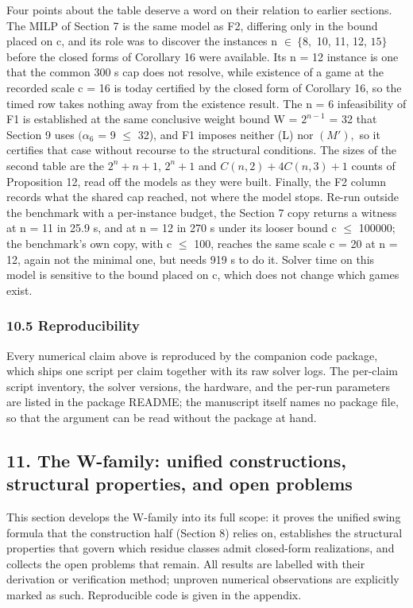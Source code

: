 \documentclass[
]{article}
\begin{document}
Four points about the table deserve a word on their relation to earlier
sections. The MILP of Section 7 is the same model as F2, differing only
in the bound placed on c, and its role was to discover the instances n
\(\in\ \{8,\) 10, 11, 12, \(15\}\) before the closed forms of Corollary
16 were available. Its n = 12 instance is one that the common 300 s cap
does not resolve, while existence of a game at the recorded scale c = 16
is today certified by the closed form of Corollary 16, so the timed row
takes nothing away from the existence result. The n = 6 infeasibility of
F1 is established at the same conclusive weight bound W = \(2^{n-1}\) =
32 that Section 9 uses \((\alpha_6\) = 9 \(\le\) 32), and F1 imposes
neither (L) nor \((M'),\) so it certifies that case without recourse to
the structural conditions. The sizes of the second table are the
\(2^n+n+1\), \(2^n+1\) and \(C(n,2)+4C(n,3)+1\) counts of Proposition
12, read off the models as they were built. Finally, the F2 column
records what the shared cap reached, not where the model stops. Re-run
outside the benchmark with a per-instance budget, the Section 7 copy
returns a witness at n = 11 in 25.9 s, and at n = 12 in 270 s under its
looser bound c \(\le\) 100000; the benchmark's own copy, with c \(\le\)
100, reaches the same scale c = 20 at n = 12, again not the minimal one,
but needs 919 s to do it. Solver time on this model is sensitive to the
bound placed on c, which does not change which games exist.

\subsubsection{10.5 Reproducibility}\label{reproducibility}

Every numerical claim above is reproduced by the companion code package,
which ships one script per claim together with its raw solver logs. The
per-claim script inventory, the solver versions, the hardware, and the
per-run parameters are listed in the package README; the manuscript
itself names no package file, so that the argument can be read without
the package at hand.

\subsection{11. The W-family: unified constructions, structural
properties, and open
problems}\label{the-w-family-unified-constructions-structural-properties-and-open-problems}

This section develops the W-family into its full scope: it proves the
unified swing formula that the construction half (Section 8) relies on,
establishes the structural properties that govern which residue classes
admit closed-form realizations, and collects the open problems that
remain. All results are labelled with their derivation or verification
method; unproven numerical observations are explicitly marked as such.
Reproducible code is given in the appendix.
\end{document}
